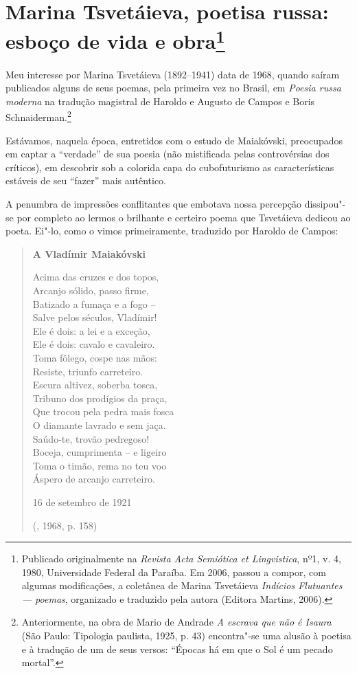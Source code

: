 \chapter{Marina Tsvetáieva, poetisa russa: esboço de vida e
obra\footnote{Publicado originalmente na \emph{Revista Acta
Semiótica et Lingvistica}, nº1, v. 4, 1980, Universidade Federal
da Paraíba. Em 2006, passou a compor, com algumas modificações,
a coletânea de Marina Tsvetáieva \emph{Indícios Flutuantes ---
poemas}, organizado e traduzido pela autora (Editora Martins, 2006).}}

Meu interesse por Marina Tsvetáieva (1892--1941) data de 1968,
quando saíram publicados alguns de seus poemas, pela primeira vez
no Brasil, em \emph{Poesia russa moderna} na tradução magistral de
Haroldo e Augusto de Campos e Boris Schnaiderman.\footnote{Anteriormente,
na obra de Mario de Andrade \emph{A escrava que não é Isaura}
(São Paulo: Tipologia paulista, 1925, p. 43) encontra"-se uma
alusão à poetisa e à tradução de um de seus versos: ``Épocas há
em que o Sol é um pecado mortal''.}

Estávamos, naquela época, entretidos com o estudo de Maiakóvski,
preocupados em captar a ``verdade'' de sua poesia (não mistificada
pelas controvérsias dos críticos), em descobrir sob a colorida capa
do cubofuturismo as características estáveis de seu ``fazer'' mais
autêntico.

A penumbra de impressões conflitantes que embotava nossa percepção
dissipou"-se por completo ao lermos o brilhante e certeiro poema
que Tsvetáieva dedicou ao poeta. Ei"-lo, como o vimos primeiramente,
traduzido por Haroldo de Campos:

\begin{verse}
\textbf{A Vladímir Maiakóvski}

Acima das cruzes e dos topos, \\
Arcanjo sólido, passo firme, \\
Batizado a fumaça e a fogo -- \\
Salve pelos séculos, Vladímir! \\[8pt]
Ele é dois: a lei e a exceção, \\
Ele é dois: cavalo e cavaleiro. \\
Toma fôlego, cospe nas mãos: \\
Resiste, triunfo carreteiro. \\[8pt]
Escura altivez, soberba tosca, \\
Tribuno dos prodígios da praça, \\
Que trocou pela pedra mais fosca \\
O diamante lavrado e sem jaça. \\[8pt]
Saúdo-te, trovão pedregoso! \\
Boceja, cumprimenta -- e ligeiro \\
Toma o timão, rema no teu voo \\
Áspero de arcanjo carreteiro. 

16 de setembro de 1921

(, 1968, p. 158)
\end{verse}

